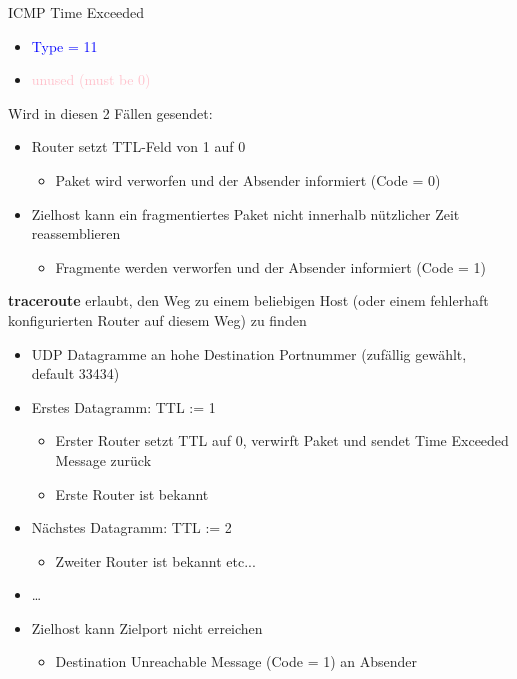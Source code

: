 \begin{definition}{ICMP Time Exceeded}
    \begin{itemize}
        \item \textcolor{blue}{Type = 11}
        \item \textcolor{pink}{unused (must be 0)}
    \end{itemize}
    Wird in diesen 2 Fällen gesendet:
    \begin{itemize}
        \item Router setzt TTL-Feld von 1 auf 0
        \begin{itemize}
            \item Paket wird verworfen und der Absender informiert (Code = 0)
        \end{itemize}
        \item Zielhost kann ein fragmentiertes Paket nicht innerhalb nützlicher Zeit reassemblieren
        \begin{itemize}
            \item Fragmente werden verworfen und der Absender informiert (Code = 1)
        \end{itemize}
    \end{itemize}
    \textbf{traceroute} erlaubt, den Weg zu einem beliebigen Host (oder einem fehlerhaft konfigurierten Router auf diesem Weg) zu finden
    \begin{itemize}
        \item UDP Datagramme an hohe Destination Portnummer (zufällig gewählt, default 33434)
        \item Erstes Datagramm: TTL := 1
        \begin{itemize}
            \item Erster Router setzt TTL auf 0, verwirft Paket und sendet Time Exceeded Message zurück
            \item Erste Router ist bekannt
        \end{itemize}
        \item Nächstes Datagramm: TTL := 2
        \begin{itemize}
            \item Zweiter Router ist bekannt etc...
        \end{itemize}
        \item …
        \item Zielhost kann Zielport nicht erreichen
        \begin{itemize}
            \item Destination Unreachable Message (Code = 1) an Absender

\end{itemize}
\end{itemize}
\end{definition}
